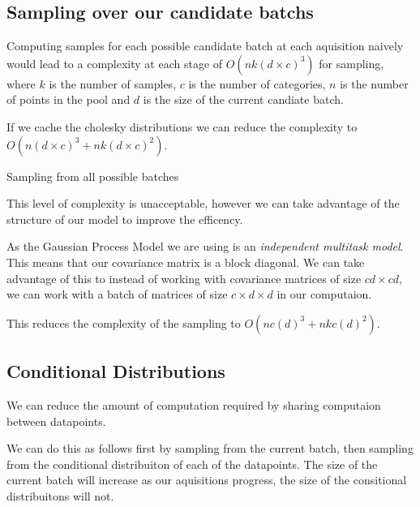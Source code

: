 \documentclass[12pt, a4paper]{report}
\theoremstyle{definition}
\begin{document}
\subsection{Sampling over our candidate batchs}

Computing samples for each possible candidate batch at each aquisition naively would lead to a complexity at each stage of $O\left(n k (d \times c)^3 \right)$ for sampling, where $k$ is the number of samples, $c$ is the number of categories, $n$ is the number of points in the pool and $d$ is the size of the current candiate batch.

If we cache the cholesky distributions we can reduce the complexity to $O(n (d \times c)^3  + n k (d \times c)^2)$.

\begin{algorithm}[H]
    \SetAlgoLined
     \caption{Sampling from all possible batches}
\end{algorithm}

This level of complexity is unacceptable, however we can take advantage of the structure of our model to improve the efficency.

As the Gaussian Process Model we are using is an \textit{independent multitask model}. This means that our covariance matrix is a block diagonal. We can take advantage of this to instead of working with covariance matrices of size $ cd \times cd $, we can work with a batch of matrices of size $c \times d \times d$ in our computaion.


This reduces the complexity of the sampling to $O(n c (d)^3  + n k c (d)^2)$.

\subsection{Conditional Distributions}

We can reduce the amount of computation required by sharing computaion between datapoints.

We can do this as follows first by sampling from the current batch, then sampling from the conditional distribuiton of each of the datapoints. The size of the current batch will increase as our aquisitions progress, the size of the consitional distribuitons will not.
\end{document}
